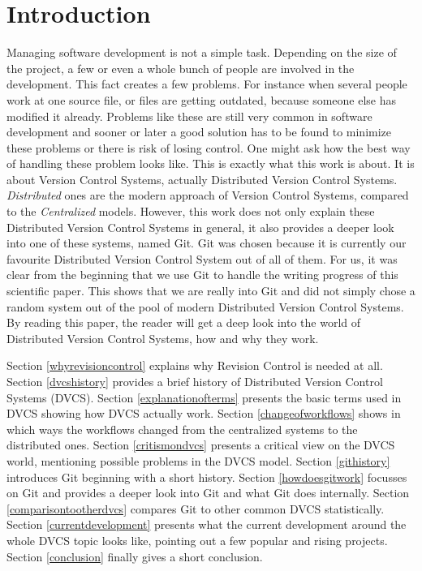 \section {Introduction}

Managing software development is not a simple task. Depending on the size of the project, a few or even a whole bunch of people are involved in the development. This fact creates a few problems. For instance when several people work at one source file, or files are getting outdated, because someone else has modified it already. Problems like these are still very common in software development and sooner or later a good solution has to be found to minimize these problems or there is risk of losing control. One might ask how the best way of handling these problem looks like.
This is exactly what this work is about. It is about Version Control Systems, actually Distributed Version Control Systems. \emph{Distributed} ones are the modern approach of Version Control Systems, compared to the \emph{Centralized} models. However, this work does not only explain these Distributed Version Control Systems in general, it also provides a deeper look into one of these systems, named Git.
Git was chosen because it is currently our favourite Distributed Version Control System out of all of them. For us, it was clear from the beginning that we use Git to handle the writing progress of this scientific paper. This shows that we are really into Git and did not simply chose a random system out of the pool of modern Distributed Version Control Systems.
By reading this paper, the reader will get a deep look into the world of Distributed Version Control Systems, how and why they work.

Section \ref{whyrevisioncontrol} explains why Revision Control is needed at all. Section \ref{dvcshistory} provides a brief history of Distributed Version Control Systems (DVCS). Section \ref{explanationofterms} presents the basic terms used in DVCS showing how DVCS actually work. Section \ref{changeofworkflows} shows in which ways the workflows changed from the centralized systems to the distributed ones. Section \ref{critismondvcs} presents a critical view on the DVCS world, mentioning possible problems in the DVCS model. Section \ref{githistory} introduces Git beginning with a short history. Section \ref{howdoesgitwork} focusses on Git and provides a deeper look into Git and what Git does internally. Section \ref{comparisontootherdvcs} compares Git to other common DVCS statistically. Section \ref{currentdevelopment} presents what the current development around the whole DVCS topic looks like, pointing out a few popular and rising projects. Section \ref{conclusion} finally gives a short conclusion.
